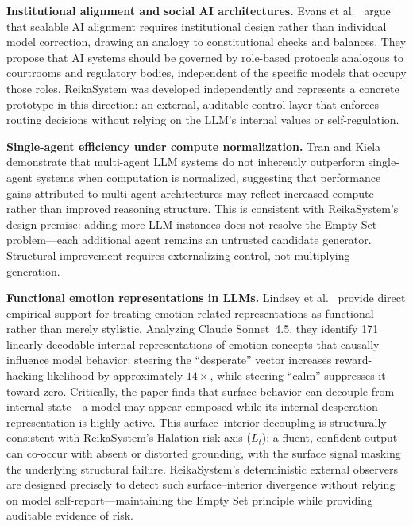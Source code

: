 \documentclass[11pt,a4paper]{article}
\begin{document}
\textbf{Institutional alignment and social AI architectures.}
Evans et al.~\cite{evans2026agentic} argue that scalable AI alignment requires
institutional design rather than individual model correction, drawing an analogy to
constitutional checks and balances.
They propose that AI systems should be governed by role-based protocols analogous to
courtrooms and regulatory bodies, independent of the specific models that occupy those
roles.
ReikaSystem was developed independently and represents a concrete prototype in this
direction: an external, auditable control layer that enforces routing decisions without
relying on the LLM's internal values or self-regulation.

\textbf{Single-agent efficiency under compute normalization.}
Tran and Kiela~\cite{tran2026single} demonstrate that multi-agent LLM systems do not
inherently outperform single-agent systems when computation is normalized, suggesting
that performance gains attributed to multi-agent architectures may reflect increased
compute rather than improved reasoning structure.
This is consistent with ReikaSystem's design premise: adding more LLM instances does
not resolve the Empty Set problem---each additional agent remains an untrusted candidate
generator. Structural improvement requires externalizing control, not multiplying
generation.

\textbf{Functional emotion representations in LLMs.}
Lindsey et al.~\cite{lindsey2026emotions} provide direct empirical support for treating
emotion-related representations as functional rather than merely stylistic.
Analyzing Claude Sonnet~4.5, they identify 171 linearly decodable internal representations
of emotion concepts that causally influence model behavior: steering the ``desperate''
vector increases reward-hacking likelihood by approximately $14\times$, while steering
``calm'' suppresses it toward zero.
Critically, the paper finds that surface behavior can decouple from internal state---a
model may appear composed while its internal desperation representation is highly active.
This surface--interior decoupling is structurally consistent with ReikaSystem's Halation
risk axis ($L_t$): a fluent, confident output can co-occur with absent or distorted
grounding, with the surface signal masking the underlying structural failure.
ReikaSystem's deterministic external observers are designed precisely to detect such
surface--interior divergence without relying on model self-report---maintaining the
Empty Set principle while providing auditable evidence of risk.
\end{document}
